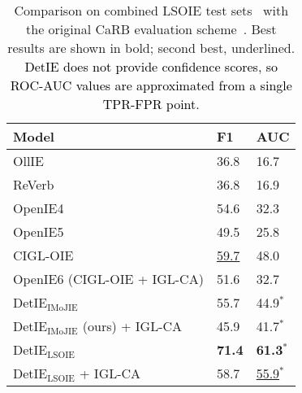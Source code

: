 \documentclass[letterpaper]{article} \usepackage{aaai22}  \usepackage{times}  \usepackage{helvet}  \usepackage{courier}  \usepackage[hyphens]{url}  \usepackage{graphicx} \usepackage{placeins}
\newcommand{\added}[1]{\textcolor{black}{#1}}
\begin{document}
\begin{table}[!t]
    \centering\small
    \setlength{\tabcolsep}{7pt}
    \begin{tabular}{l|ll} \toprule
         Model & {F1} & {AUC} \\ \hline
        OllIE~\cite{ollie-emnlp12} & 36.8 & 16.7 \\
        ReVerb~\cite{fader2011identifying} & 36.8 & 16.9 \\
        OpenIE4 & 54.6  & 32.3 \\
        OpenIE5 & 49.5  & 25.8 \\ 
        CIGL-OIE & \underline{59.7}  & 48.0 \\
        OpenIE6 (CIGL-OIE + IGL-CA) & 51.6 & 32.7\\ \hline 
        DetIE$_{\mathrm{IMoJIE}}$ & 55.7 & 44.9$^*$ \\
        DetIE$_{\mathrm{IMoJIE}}$  (ours)  + IGL-CA & 45.9 & 41.7$^*$ \\ 
        DetIE$_{\mathrm{LSOIE}}$ & \textbf{71.4} & \textbf{61.3}$^*$ \\ 
        DetIE$_{\mathrm{LSOIE}}$ + IGL-CA & 58.7 & \underline{55.9}$^*$ \\ 
        \bottomrule
    \end{tabular}
    \caption{Comparison on combined LSOIE test sets~\cite{lsoie-2021} with the original CaRB evaluation scheme~\cite{bhardwaj-etal-2019-carb}. 
    Best results are shown in bold; second best, underlined. \added{DetIE does not provide confidence scores, so ROC-AUC values are approximated from a single TPR-FPR point.}}
    \label{tab:lsoie_table}
\end{table}
\end{document}
